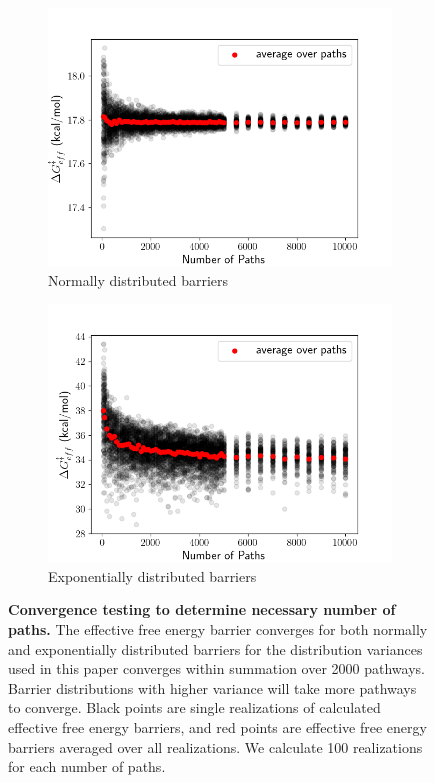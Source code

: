 \begin{figure}[H]
    \centering
    \begin{subfigure}[b]{0.45\textwidth}
        \centering
        \includegraphics[width=\textwidth]{figures/effective_barrier_convergence_norm.png}
        \caption{Normally distributed barriers}
        \label{fig:convergence_normal}
    \end{subfigure}
    \hfill
    \begin{subfigure}[b]{0.45\textwidth}
        \centering
        \includegraphics[width=\textwidth]{figures/effective_barrier_convergence_exp.png}
        \caption{Exponentially distributed barriers}
        \label{fig:convergence_exponential}
    \end{subfigure}
    \caption{\textbf{{Convergence testing to determine necessary number of paths.}} The effective free energy barrier converges for both normally and exponentially distributed barriers for the distribution variances used in this paper converges within summation over 2000 pathways. Barrier distributions with higher variance will take more pathways to converge. Black points are single realizations of calculated effective free energy barriers, and red points are effective free energy barriers averaged over all realizations. We calculate 100 realizations for each number of paths.}
    \label{fig:convergence}
\end{figure}

